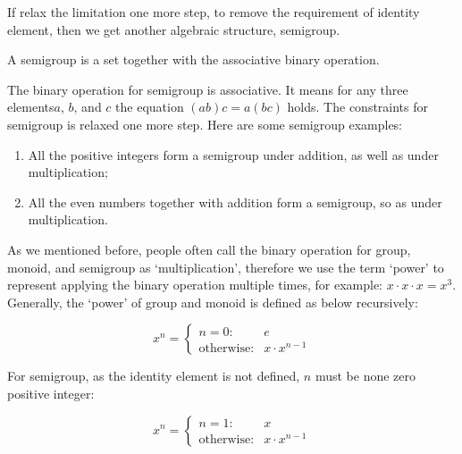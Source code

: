 \documentclass{article}
\begin{document}

If relax the limitation one more step, to remove the requirement of identity element, then we get another algebraic structure, semigroup.

\begin{definition}

A semigroup is a set together with the associative binary operation.
\end{definition}

The binary operation for semigroup is associative. It means for any three elements$a$, $b$, and $c$ the equation $(ab)c = a(bc)$ holds. The constraints for semigroup is relaxed one more step. Here are some semigroup examples:

\begin{enumerate}
\item All the positive integers form a semigroup under addition, as well as under multiplication;
\item All the even numbers together with addition form a semigroup, so as under multiplication.
\end{enumerate}

As we mentioned before, people often call the binary operation for group, monoid, and semigroup as `multiplication', therefore we use the term `power' to represent applying the binary operation multiple times, for example: $x \cdot x \cdot x = x^3$. Generally, the `power' of group and monoid is defined as below recursively:

\[
x^n = \left .
  \begin{cases}
  n = 0 : & e \\
  \text{otherwise}: & x \cdot x^{n-1}
  \end{cases}
\right .
\]

For semigroup, as the identity element is not defined, $n$ must be none zero positive integer:

\[
x^n = \left .
  \begin{cases}
  n = 1 : & x \\
  \text{otherwise}: & x \cdot x^{n-1}
  \end{cases}
\right .
\]

\begin{Exercise}
\end{Exercise}
\end{document}
